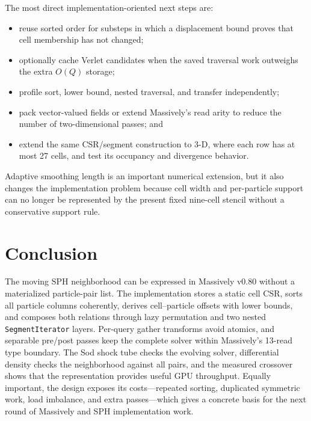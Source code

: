 \documentclass[a4paper,10pt]{article}
\newcommand{\code}[1]{\texttt{#1}}
\begin{document}
The most direct implementation-oriented next steps are:
\begin{itemize}
  \item reuse sorted order for substeps in which a displacement bound proves
        that cell membership has not changed;
  \item optionally cache Verlet candidates when the saved traversal work
        outweighs the extra $O(Q)$ storage;
  \item profile sort, lower bound, nested traversal, and transfer independently;
  \item pack vector-valued fields or extend Massively's read arity to reduce the
        number of two-dimensional passes; and
  \item extend the same CSR/segment construction to 3-D, where each row has at
        most 27 cells, and test its occupancy and divergence behavior.
\end{itemize}
Adaptive smoothing length is an important numerical extension, but it also
changes the implementation problem because cell width and per-particle support
can no longer be represented by the present fixed nine-cell stencil without a
conservative support rule.

\section{Conclusion}

The moving SPH neighborhood can be expressed in Massively v0.80 without a
materialized particle-pair list.  The implementation stores a static cell CSR,
sorts all particle columns coherently, derives cell--particle offsets with lower
bounds, and composes both relations through lazy permutation and two nested
\code{SegmentIterator} layers.  Per-query gather transforms avoid atomics, and
separable pre/post passes keep the complete solver within Massively's 13-read
type boundary.  The Sod shock tube checks the evolving solver, differential
density checks the neighborhood against all pairs, and the measured crossover
shows that the representation provides useful GPU throughput.  Equally
important, the design exposes its costs---repeated sorting, duplicated symmetric
work, load imbalance, and extra passes---which gives a concrete basis for the
next round of Massively and SPH implementation work.

{\small


}
\end{document}

